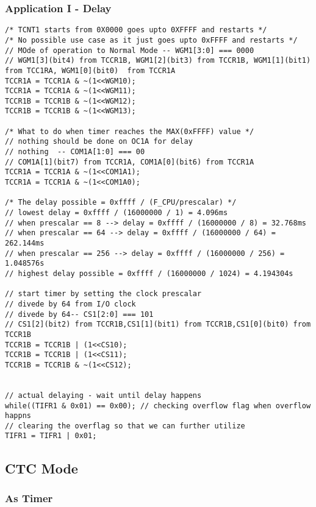 \documentclass{article}
\begin{document}
\subsubsection{Application I - Delay}
\begin{verbatim}
/* TCNT1 starts from 0X0000 goes upto 0XFFFF and restarts */
/* No possible use case as it just goes upto 0xFFFF and restarts */
// MOde of operation to Normal Mode -- WGM1[3:0] === 0000
// WGM1[3](bit4) from TCCR1B, WGM1[2](bit3) from TCCR1B, WGM1[1](bit1)  from TCC1RA, WGM1[0](bit0)  from TCCR1A	
TCCR1A = TCCR1A & ~(1<<WGM10);
TCCR1A = TCCR1A & ~(1<<WGM11);
TCCR1B = TCCR1B & ~(1<<WGM12);
TCCR1B = TCCR1B & ~(1<<WGM13);

/* What to do when timer reaches the MAX(0xFFFF) value */
// nothing should be done on OC1A for delay
// nothing  -- COM1A[1:0] === 00
// COM1A[1](bit7) from TCCR1A, COM1A[0](bit6) from TCCR1A
TCCR1A = TCCR1A & ~(1<<COM1A1);
TCCR1A = TCCR1A & ~(1<<COM1A0);
    
/* The delay possible = 0xffff / (F_CPU/prescalar) */
// lowest delay = 0xffff / (16000000 / 1) = 4.096ms
// when prescalar == 8 --> delay = 0xffff / (16000000 / 8) = 32.768ms
// when prescalar == 64 --> delay = 0xffff / (16000000 / 64) = 262.144ms
// when prescalar == 256 --> delay = 0xffff / (16000000 / 256) = 1.048576s
// highest delay possible = 0xffff / (16000000 / 1024) = 4.194304s

// start timer by setting the clock prescalar
// divede by 64 from I/O clock
// divede by 64-- CS1[2:0] === 101
// CS1[2](bit2) from TCCR1B,CS1[1](bit1) from TCCR1B,CS1[0](bit0) from TCCR1B
TCCR1B = TCCR1B | (1<<CS10);
TCCR1B = TCCR1B | (1<<CS11);
TCCR1B = TCCR1B & ~(1<<CS12);


// actual delaying - wait until delay happens
while((TIFR1 & 0x01) == 0x00); // checking overflow flag when overflow happns
// clearing the overflag so that we can further utilize
TIFR1 = TIFR1 | 0x01;
\end{verbatim}

\subsection{CTC Mode}
\subsubsection{As Timer}
\end{document}
